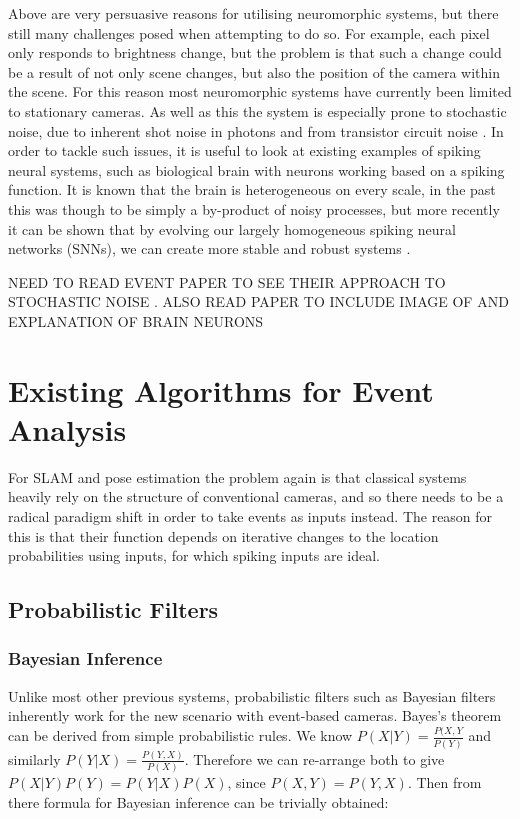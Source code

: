 Above are very persuasive reasons for utilising neuromorphic systems, but there still many challenges posed when attempting to do so. For example, each pixel only responds to brightness change, but the problem is that such a change could be a result of not only scene changes, but also the position of the camera within the scene. For this reason most neuromorphic systems have currently been limited to stationary cameras. As well as this the system is especially prone to stochastic noise, due to inherent shot noise in photons and from transistor circuit noise \cite{EventBasedVisionASurvery}. In order to tackle such issues, it is useful to look at existing examples of spiking neural systems, such as biological brain with neurons working based on a spiking function. It is known that the brain is heterogeneous on every scale, in the past this was though to be simply a by-product of noisy processes, but more recently it can be shown that by evolving our largely homogeneous spiking neural networks (SNNs), we can create more stable and robust systems \cite{NeuralHetroPromRobLearn}.

\color{red} NEED TO READ EVENT PAPER TO SEE THEIR APPROACH TO STOCHASTIC NOISE \cite{EventBasedVisionASurvery}. ALSO READ PAPER\cite{NeuralHetroPromRobLearn} TO INCLUDE IMAGE OF AND EXPLANATION OF BRAIN NEURONS \color{black}

\section{Existing Algorithms for Event Analysis}

For SLAM and pose estimation the problem again is that classical systems heavily rely on the structure of conventional cameras, and so there needs to be a radical paradigm shift in order to take events as inputs instead. The reason for this is that their function depends on iterative changes to the location probabilities using inputs, for which spiking inputs are ideal.

\subsection{Probabilistic Filters}

\subsubsection{Bayesian Inference}

Unlike most other previous systems, probabilistic filters such as Bayesian filters inherently work for the new scenario with event-based cameras. Bayes's theorem can be derived from simple probabilistic rules\cite{BayesLaw}. We know $P(X|Y) = \frac{P(X, Y}{P(Y)} $ and similarly $ P(Y|X) = \frac{P(Y, X)}{P(X)} $. Therefore we can re-arrange both to give $ P(X|Y)P(Y) = P(Y|X)P(X) $, since $ P(X, Y) = P(Y, X) $. Then from there formula for Bayesian inference can be trivially obtained:

